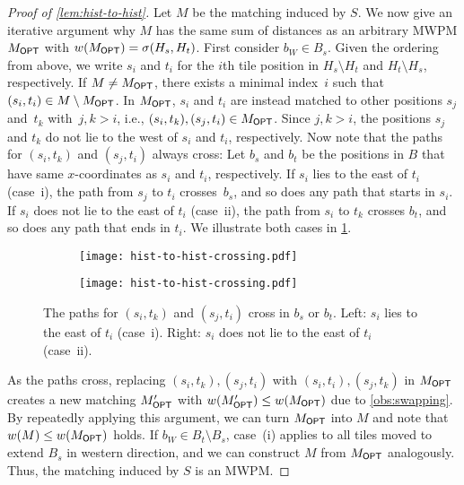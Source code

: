 \begin{proof}[Proof of \cref{lem:hist-to-hist}]
    Let $M$ be the matching induced by $S$. We now give an iterative argument why $M$ has the same sum of distances as an arbitrary MWPM $M_{\textsf{OPT}}$ with $w(M_{\textsf{OPT}}) = \sigma(H_s,H_t)$.
    First consider $b_W \in B_s$.
    Given the ordering from above, we write $s_i$ and $t_i$ for the $i$th tile position in $H_s \setminus H_t$ and $H_t \setminus H_s$, respectively.
    If $M \neq M_{\textsf{OPT}}$, there exists a minimal index~$i$ such that $(s_i, t_i) \in M \setminus M_{\textsf{OPT}}$.
    In $M_{\textsf{OPT}}$, $s_i$ and $t_i$ are instead matched to other positions $s_j$ and~$t_k$ with~$j, k > i$, i.e., $(s_i, t_k),(s_j, t_i)\in M_{\textsf{OPT}}$.
    Since $j, k > i$, the positions $s_j$ and $t_k$ do not lie to the west of $s_i$ and $t_i$, respectively.
    Now note that the paths for $(s_i, t_k)$ and $(s_j, t_i)$ always cross:
    Let $b_s$ and $b_t$ be the positions in $B$ that have same $x$-coordinates as $s_i$ and $t_i$, respectively.
    If $s_i$ lies to the east of $t_i$ (case~i), the path from $s_j$ to $t_i$ crosses~$b_s$, and so does any path that starts in $s_i$.
    If $s_i$ does not lie to the east of $t_i$ (case~ii), the path from $s_i$ to $t_k$ crosses $b_t$, and so does any path that ends in $t_i$.
    We illustrate both cases in \cref{fig:hist-to-hist-crossing}.

	\begin{figure}[htb]
		\begin{subfigure}[t]{0.5\columnwidth}
			\centering%
			\texttt{[image: hist-to-hist-crossing.pdf]}%
		\end{subfigure}%
		\begin{subfigure}[t]{0.5\columnwidth}
			\centering%
			\texttt{[image: hist-to-hist-crossing.pdf]}%
		\end{subfigure}%
		\caption{%
            The paths for $(s_i, t_k)$ and $(s_j, t_i)$ cross in $b_s$ or $b_t$.
            Left: $s_i$ lies to the east of $t_i$ (case~i).
            Right: $s_i$ does not lie to the east of $t_i$ (case~ii).
        }
		\label{fig:hist-to-hist-crossing}
	\end{figure}

    As the paths cross, replacing $(s_i, t_k), (s_j, t_i)$ with $(s_i, t_i), (s_j, t_k)$ in $M_{\textsf{OPT}}$ creates a new matching $M_{\textsf{OPT}}'$ with $w(M_{\textsf{OPT}}') \leq w(M_{\textsf{OPT}})$ due to \cref{obs:swapping}.
    By repeatedly applying this argument, we can turn $M_{\textsf{OPT}}$ into $M$ and note that $w(M) \leq w(M_{\textsf{OPT}})$ holds.
    If $b_W \in B_t \setminus B_s$, case~(i) applies to all tiles moved to extend $B_s$ in western direction, and we can construct $M$ from $M_{\textsf{OPT}}$ analogously.
    Thus, the matching induced by $S$ is an MWPM.


\end{proof}
